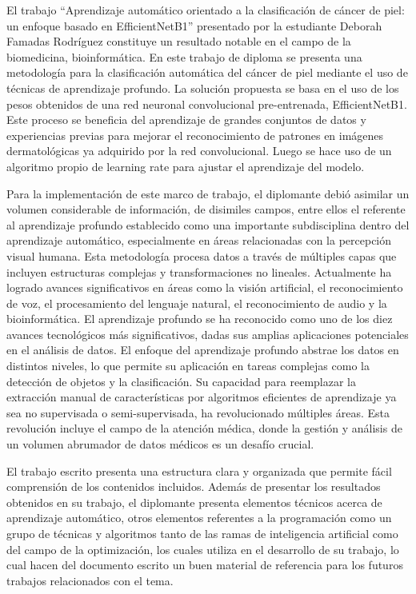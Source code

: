 \begin{opinion}

El trabajo “Aprendizaje automático orientado a la clasificación de cáncer de piel: un enfoque basado en EfficientNetB1” presentado por la estudiante Deborah Famadas Rodríguez constituye un resultado notable en el campo de la biomedicina, bioinformática. En este trabajo de diploma se presenta una metodología para la clasificación automática del cáncer de piel mediante el uso de técnicas de aprendizaje profundo. La solución propuesta se basa en el uso de los pesos obtenidos de una red neuronal convolucional pre-entrenada, EfficientNetB1. Este proceso se beneficia del aprendizaje de grandes conjuntos de datos y experiencias previas para mejorar el reconocimiento de patrones en imágenes dermatológicas ya adquirido por la red convolucional. Luego se hace uso de un algoritmo propio de learning rate para ajustar el aprendizaje del modelo. 

Para la implementación de este marco de trabajo, el diplomante debió asimilar un volumen considerable de información, de disimiles campos, entre ellos el referente al aprendizaje profundo establecido como una importante subdisciplina dentro del aprendizaje automático, especialmente en áreas relacionadas con la percepción visual humana. Esta metodología procesa datos a través de múltiples capas que incluyen estructuras complejas y transformaciones no lineales. Actualmente ha logrado avances significativos en áreas como la visión artificial, el reconocimiento de voz, el procesamiento del lenguaje natural, el reconocimiento de audio y la bioinformática. El aprendizaje profundo se ha reconocido como uno de los diez avances tecnológicos más significativos, dadas sus amplias aplicaciones potenciales en el análisis de datos. El enfoque del aprendizaje profundo abstrae los datos en distintos niveles, lo que permite su aplicación en tareas complejas como la detección de objetos y la clasificación. Su capacidad para reemplazar la extracción manual de características por algoritmos eficientes de aprendizaje ya sea no supervisada o semi-supervisada, ha revolucionado múltiples áreas. Esta revolución incluye el campo de la atención médica, donde la gestión y análisis de un volumen abrumador de datos médicos es un desafío crucial.

El trabajo escrito presenta una estructura clara y organizada que permite fácil comprensión de los contenidos incluidos. Además de presentar los resultados obtenidos en su trabajo, el diplomante presenta elementos técnicos acerca de aprendizaje automático, otros elementos referentes a la programación como un grupo de técnicas y algoritmos tanto de las ramas de inteligencia artificial como del campo de la optimización, los cuales utiliza en el desarrollo de su trabajo, lo cual hacen del documento escrito un buen material de referencia para los futuros trabajos relacionados con el tema.


\end{opinion}
